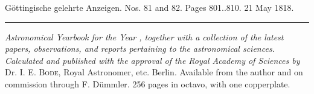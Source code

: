 \clearpage
{}
\hypertarget{native-610-lower}{}
\begin{center}\small Göttingische gelehrte Anzeigen. Nos. 81 and 82. Pages 801..810. 21 May 1818.\\[3pt]\rule{.72\linewidth}{.3pt}\end{center}

\emph{Astronomical Yearbook for the Year {}, together with a collection of the latest papers, observations, and reports pertaining to the astronomical sciences. Calculated and published with the approval of the Royal Academy of Sciences by} Dr. I. E. \textsc{Bode}, Royal Astronomer, etc. Berlin. Available from the author and on commission through F. Dümmler. 256 pages in octavo, with one copperplate.

\begingroup{}\relax
